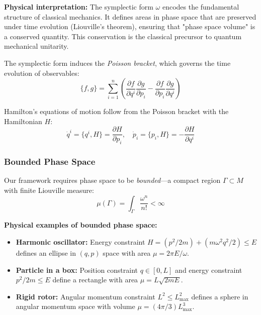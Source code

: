 \documentclass[twocolumn,10pt]{article}
\theoremstyle{remark}
\begin{document}
\textbf{Physical interpretation:} The symplectic form $\omega$ encodes the fundamental structure of classical mechanics. It defines areas in phase space that are preserved under time evolution (Liouville's theorem), ensuring that "phase space volume" is a conserved quantity. This conservation is the classical precursor to quantum mechanical unitarity.

The symplectic form induces the \textit{Poisson bracket}, which governs the time evolution of observables:
\begin{equation}
    \{f, g\} = \sum_{i=1}^{n} \left( \frac{\partial f}{\partial q^i} \frac{\partial g}{\partial p_i} - \frac{\partial f}{\partial p_i} \frac{\partial g}{\partial q^i} \right)
    \label{eq:poisson_bracket}
\end{equation}

Hamilton's equations of motion follow from the Poisson bracket with the Hamiltonian $H$:
\begin{equation}
    \dot{q}^i = \{q^i, H\} = \frac{\partial H}{\partial p_i}, \quad
    \dot{p}_i = \{p_i, H\} = -\frac{\partial H}{\partial q^i}
    \label{eq:hamilton_equations}
\end{equation}

\subsubsection{Bounded Phase Space}

Our framework requires phase space to be \textit{bounded}—a compact region $\Gamma \subset M$ with finite Liouville measure:
\begin{equation}
    \mu(\Gamma) = \int_\Gamma \frac{\omega^n}{n!} < \infty
    \label{eq:liouville_measure}
\end{equation}

\textbf{Physical examples of bounded phase space:}
\begin{itemize}
    \item \textbf{Harmonic oscillator:} Energy constraint $H = (p^2/2m) + (m\omega^2 q^2/2) \leq E$ defines an ellipse in $(q, p)$ space with area $\mu = 2\pi E/\omega$.

    \item \textbf{Particle in a box:} Position constraint $q \in [0, L]$ and energy constraint $p^2/2m \leq E$ define a rectangle with area $\mu = L\sqrt{2mE}$.

    \item \textbf{Rigid rotor:} Angular momentum constraint $L^2 \leq L_{\max}^2$ defines a sphere in angular momentum space with volume $\mu = (4\pi/3)L_{\max}^3$.
\end{itemize}
\end{document}
